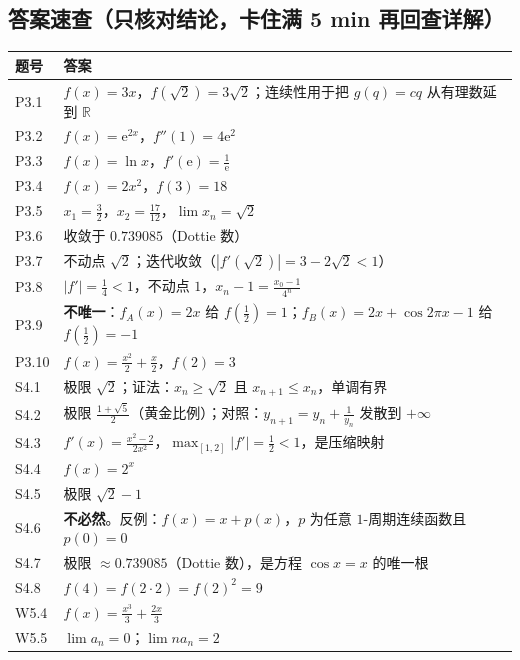 \documentclass[11pt,a4paper]{ctexart}
\newcommand{\R}{\mathbb{R}}
\newcommand{\abs}[1]{\left\lvert #1\right\rvert}
\newcommand{\ee}{\mathrm{e}}
\begin{document}
\subsection{答案速查（只核对结论，卡住满 5 min 再回查详解）}
{\footnotesize
\begin{longtable}{@{}p{1.5cm}p{13.6cm}@{}}
\toprule 题号 & 答案 \\ \midrule \endhead
\bottomrule \endlastfoot
P3.1 & $f(x)=3x$，$f(\sqrt{2})=3\sqrt{2}$；连续性用于把 $g(q)=cq$ 从有理数延到 $\R$ \\
P3.2 & $f(x)=\ee^{2x}$，$f''(1)=4\ee^{2}$ \\
P3.3 & $f(x)=\ln x$，$f'(\ee)=\frac{1}{\ee}$ \\
P3.4 & $f(x)=2x^{2}$，$f(3)=18$ \\
P3.5 & $x_{1}=\frac{3}{2}$，$x_{2}=\frac{17}{12}$，$\lim x_{n}=\sqrt{2}$ \\
P3.6 & 收敛于 $0.739085$（Dottie 数） \\
P3.7 & 不动点 $\sqrt{2}$；迭代收敛（$\abs{f'(\sqrt{2})}=3-2\sqrt{2}<1$） \\
P3.8 & $\abs{f'}=\frac{1}{4}<1$，不动点 $1$，$x_{n}-1=\frac{x_{0}-1}{4^{n}}$ \\
P3.9 & \textbf{不唯一}：$f_{A}(x)=2x$ 给 $f(\frac{1}{2})=1$；$f_{B}(x)=2x+\cos 2\pi x-1$ 给 $f(\frac{1}{2})=-1$ \\
P3.10 & $f(x)=\frac{x^{2}}{2}+\frac{x}{2}$，$f(2)=3$ \\
S4.1 & 极限 $\sqrt2$；证法：$x_{n}\geq\sqrt2$ 且 $x_{n+1}\leq x_{n}$，单调有界 \\
S4.2 & 极限 $\frac{1+\sqrt5}{2}$（黄金比例）；对照：$y_{n+1}=y_{n}+\frac1{y_{n}}$ 发散到 $+\infty$ \\
S4.3 & $f'(x)=\frac{x^{2}-2}{2x^{2}}$，$\max_{[1,2]}\abs{f'}=\frac12<1$，是压缩映射 \\
S4.4 & $f(x)=2^{x}$ \\
S4.5 & 极限 $\sqrt2-1$ \\
S4.6 & \textbf{不必然}。反例：$f(x)=x+p(x)$，$p$ 为任意 $1$-周期连续函数且 $p(0)=0$ \\
S4.7 & 极限 $\approx0.739085$（Dottie 数），是方程 $\cos x=x$ 的唯一根 \\
S4.8 & $f(4)=f(2\cdot2)=f(2)^{2}=9$ \\
W5.4 & $f(x)=\frac{x^3}{3}+\frac{2x}{3}$ \\
W5.5 & $\lim a_n=0$；$\lim n a_n=2$ \\
\end{longtable}}

\newpage
\newpage
\end{document}
